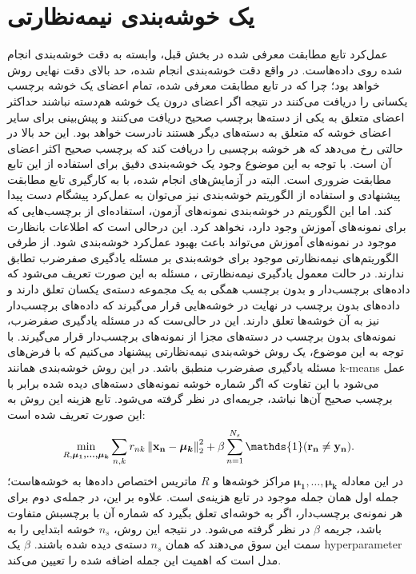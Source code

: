 \section{یک خوشه‌بندی نیمه‌نظارتی}\label{clustering_method}
عمل‌کرد تابع مطابقت معرفی شده در بخش قبل، وابسته به دقت خوشه‌بندی انجام شده روی داده‌هاست. در واقع دقت خوشه‌بندی انجام شده، حد بالای دقت نهایی روش خواهد بود؛ چرا که در تابع مطابقت معرفی شده، تمام اعضای یک خوشه برچسب یکسانی را دریافت می‌کنند در نتیجه اگر اعضای درون یک خوشه هم‌دسته نباشند حداکثر اعضای متعلق به یکی از دسته‌ها برچسب صحیح دریافت می‌کنند و پیش‌بینی برای سایر اعضای خوشه که متعلق به دسته‌های دیگر هستند نادرست خواهد بود.
 این حد بالا  در حالتی رخ می‌دهد که هر خوشه برچسبی را دریافت کند که برچسب صحیح  اکثر اعضای آن است. با توجه به این موضوع وجود یک خوشه‌بندی دقیق برای استفاده از این تابع مطابقت ضروری است. البته در آزمایش‌های انجام شده، با به کارگیری تابع مطابقت پیشنهادی و استفاده از  الگوریتم خوشه‌بندی
 \cite{kmeans}
نیز می‌توان به عمل‌کرد پیشگام دست پیدا کند. اما این الگوریتم در خوشه‌بندی نمونه‌های آزمون، استفاده‌ای از برچسب‌هایی که برای نمونه‌های آموزش وجود دارد، نخواهد کرد. این درحالی است که  اطلاعات بانظارت موجود در نمونه‌های آموزش می‌تواند باعث بهبود عمل‌کرد خوشه‌بندی شود. از طرفی الگوریتم‌های نیمه‌نظارتی موجود برای خوشه‌بندی بر مسئله یادگیری صفرضرب تطابق ندارند. در حالت معمول یادگیری نیمه‌نظارتی \cite{chapel06}، مسئله به این صورت تعریف می‌شود که داده‌های برچسب‌دار و بدون برچسب همگی به یک مجموعه دسته‌ی یکسان تعلق دارند و داده‌های بدون برچسب در نهایت در خوشه‌هایی قرار می‌گیرند که داده‌های برچسب‌دار نیز به آن خوشه‌ها تعلق دارند. این در حالی‌ست که در مسئله یادگیری صفرضرب، نمونه‌های بدون برچسب در دسته‌های مجزا از نمونه‌های برچسب‌دار قرار می‌گیرند. با توجه به این موضوع، یک روش خوشه‌بندی نیمه‌نظارتی پیشنهاد می‌کنیم که با فرض‌های مسئله یادگیری صفرضرب منطبق باشد. در این روش خوشه‌بندی همانند k-means عمل می‌شود با این تفاوت که اگر شماره خوشه نمونه‌های دسته‌های دیده شده  برابر با برچسب صحیح آن‌ها نباشد، جریمه‌ای در نظر گرفته می‌شود. تابع هزینه این روش به این صورت تعریف شده است:
\begin{equation} \label{eq:my_clustering}
\min_{R, \boldsymbol{\mu_1, \ldots, \mu_k }}  \sum_{n,k} r_{nk} \normtwo{\mathbf{x_n} - \boldsymbol{\mu_k}} +
 \beta \sum_{n=1}^{N_s} \mathds{1}(\mathbf{r_n} \neq \mathbf{y_n}).
\end{equation}
در این معادله $ \boldsymbol{\mu_1, \ldots, \mu_k }$ مراکز خوشه‌ها و $R$ ماتریس اختصاص داده‌ها به خوشه‌هاست؛ جمله اول همان جمله موجود در تابع هزینه‌ی
است. علاوه بر این، در جمله‌ی دوم برای هر نمونه‌ی برچسب‌دار، اگر به خوشه‌ای تعلق بگیرد که شماره آن با برچسبش متفاوت باشد، جریمه $\beta$ در نظر گرفته می‌شود. در نتیجه این روش، $n_s$ خوشه ابتدایی را به سمت این سوق می‌دهند که همان $n_s$ دسته‌ی دیده شده باشند.  $\beta$ یک \gls{hyperparameter} مدل است که اهمیت این جمله اضافه شده را تعیین می‌کند.

